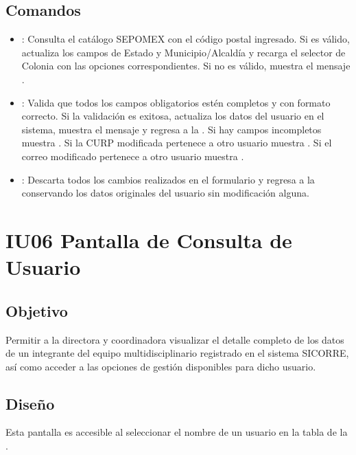 \subsection{Comandos}
\begin{itemize}
	\item {}: Consulta el catálogo SEPOMEX con el 
	código postal ingresado. Si es válido, actualiza los campos de 
	Estado y Municipio/Alcaldía y recarga el selector de Colonia 
	con las opciones correspondientes. Si no es válido, muestra 
	el mensaje .
	
	\item {}: Valida que todos los campos 
	obligatorios estén completos y con formato correcto. Si la 
	validación es exitosa, actualiza los datos del usuario en el 
	sistema, muestra el mensaje  
	y regresa a la . 
	Si hay campos incompletos muestra 
	. Si la CURP 
	modificada pertenece a otro usuario muestra 
	. Si el correo modificado 
	pertenece a otro usuario muestra 
	.
	
	\item {}: Descarta todos los cambios realizados 
	en el formulario y regresa a la 
	 conservando los 
	datos originales del usuario sin modificación alguna.
\end{itemize}

\section{IU06 Pantalla de Consulta de Usuario}

\subsection{Objetivo}
Permitir a la directora y coordinadora visualizar el detalle completo 
de los datos de un integrante del equipo multidisciplinario registrado 
en el sistema SICORRE, así como acceder a las opciones de gestión 
disponibles para dicho usuario.

\subsection{Diseño}
Esta pantalla  es 
accesible al seleccionar el nombre de un usuario en la tabla de la 
.

